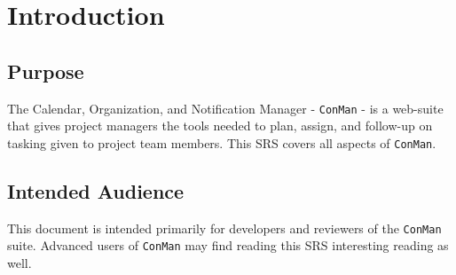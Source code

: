 \documentclass{article}
\begin{document}

\normalsize

\newpage
\tableofcontents

\newpage
\section{Introduction}
\subsection{Purpose}
The Calendar, Organization, and Notification Manager - \texttt{ConMan} - is a web-suite that gives project managers the tools needed to plan, assign, and follow-up on tasking given to project team members.  This SRS covers all aspects of \texttt{ConMan}.



\subsection{Intended Audience} %
This document is intended primarily for developers and reviewers of the \texttt{ConMan} suite.  
Advanced users of \texttt{ConMan} may find reading this SRS interesting reading as well.
\end{document}
